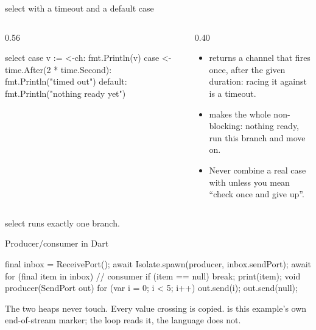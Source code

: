 \documentclass[10pt,aspectratio=169,t]{beamer}
\begin{document}
\begin{frame}[fragile,eyebrow=Goroutines]{select with a timeout and a default case}
  \begin{columns}[T]
    \begin{column}{0.56\textwidth}
\begin{golang}
select {
case v := <-ch:
    fmt.Println(v)
case <-time.After(2 * time.Second):
    fmt.Println("timed out")
default:
    fmt.Println("nothing ready yet")
}
\end{golang}
    \end{column}
    \begin{column}{0.40\textwidth}
      \begin{itemize}
        \item {} returns a channel that fires once, after the given duration: racing it against  is a timeout.
        \item {} makes the whole  non-blocking: nothing ready, run this branch and move on.
        \item Never combine a real case with  unless you mean ``check once and give up''.
      \end{itemize}
    \end{column}
  \end{columns}
  \begin{takeaway}{select runs exactly one branch.}
  \end{takeaway}
\end{frame}


\begin{frame}[fragile,eyebrow=Compared]{Producer/consumer in Dart}
\begin{dart}
final inbox = ReceivePort();
await Isolate.spawn(producer, inbox.sendPort);
await for (final item in inbox) {   // consumer
  if (item == null) break;
  print(item);
}
void producer(SendPort out) {
  for (var i = 0; i < 5; i++) out.send(i);
  out.send(null);
}
\end{dart}
  \begin{takeaway}{The two heaps never touch.}
    Every value crossing  is copied.  is this example's own end-of-stream marker; the loop reads it, the language does not.
  \end{takeaway}
\end{frame}
\end{document}

